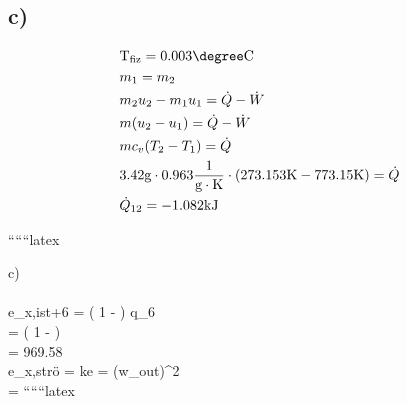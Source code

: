 

\subsection*{c)}
\begin{align*}
&\text{T}_{\text{fiz}} = 0.003 \degree \text{C} \\
&m_1 = m_2 \\
&m_2 u_2 - m_1 u_1 = \dot{Q} - \dot{W} \\
&m (u_2 - u_1) = \dot{Q} - \dot{W} \\
&m c_v (T_2 - T_1) = \dot{Q} \\
&3.42 \text{g} \cdot 0.963 \frac{1}{\text{g} \cdot \text{K}} \cdot (273.153 \text{K} - 773.15 \text{K}) = \dot{Q} \\
&\dot{Q}_{12} = -1.082 \text{kJ}
\end{align*}

``````latex

c) \\
 \\
e_{x,ist+6} = \left( 1 -  \right) \cdot q_6 \\
= \left( 1 -  \right)  \,  \\
= 969.58 \,  \\

e_{x,strö} =  \cdot ke =   (w_{out})^2 \\
= 
``````latex